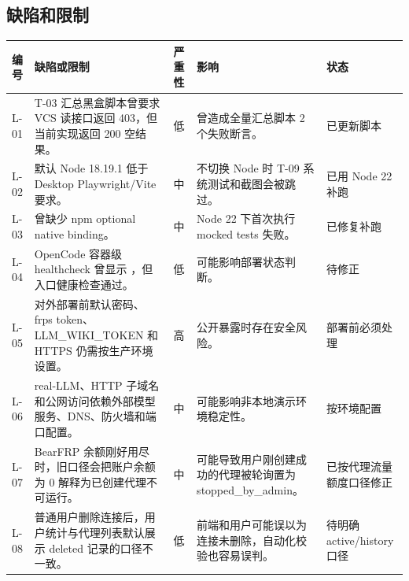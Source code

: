 \documentclass[UTF8,a4paper,12pt,fontset=fandol]{ctexart}
\newcommand{\code}[1]{\texttt{\footnotesize\detokenize{#1}}}
\begin{document}
\subsection{缺陷和限制}
\begin{longtable}{p{1.2cm}p{5.6cm}p{1.6cm}p{4.3cm}p{2.0cm}}
\toprule
编号 & 缺陷或限制 & 严重性 & 影响 & 状态 \\
\midrule
L-01 & T-03 汇总黑盒脚本曾要求 VCS 读接口返回 403，但当前实现返回 200 空结果。 & 低 & 曾造成全量汇总脚本 2 个失败断言。 & 已更新脚本 \\
L-02 & 默认 Node 18.19.1 低于 Desktop Playwright/Vite 要求。 & 中 & 不切换 Node 时 T-09 系统测试和截图会被跳过。 & 已用 Node 22 补跑 \\
L-03 & \code{llm_wiki/node_modules} 曾缺少 npm optional native binding。 & 中 & Node 22 下首次执行 mocked tests 失败。 & 已修复补跑 \\
L-04 & OpenCode 容器级 healthcheck 曾显示 \code{unhealthy}，但入口健康检查通过。 & 低 & 可能影响部署状态判断。 & 待修正 \\
L-05 & 对外部署前默认密码、frps token、LLM\_WIKI\_TOKEN 和 HTTPS 仍需按生产环境设置。 & 高 & 公开暴露时存在安全风险。 & 部署前必须处理 \\
L-06 & real-LLM、HTTP 子域名和公网访问依赖外部模型服务、DNS、防火墙和端口配置。 & 中 & 可能影响非本地演示环境稳定性。 & 按环境配置 \\
L-07 & BearFRP 余额刚好用尽时，旧口径会把账户余额为 0 解释为已创建代理不可运行。 & 中 & 可能导致用户刚创建成功的代理被轮询置为 stopped\_by\_admin。 & 已按代理流量额度口径修正 \\
L-08 & 普通用户删除连接后，用户统计与代理列表默认展示 deleted 记录的口径不一致。 & 低 & 前端和用户可能误以为连接未删除，自动化校验也容易误判。 & 待明确 active/history 口径 \\
\bottomrule
\end{longtable}
\end{document}
